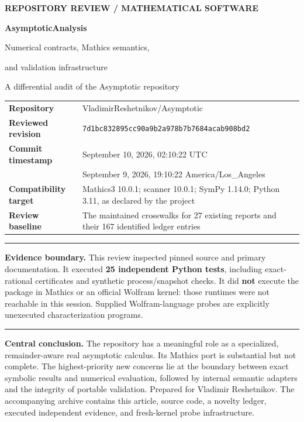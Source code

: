 \documentclass[11pt,letterpaper]{article}
\newcommand{\Snapshot}{7d1bc832895cc90a9b2a978b7b7684acab908bd2}
\begin{document}
\begin{titlepage}
\vspace*{0.45in}
{\small\bfseries\color{accent}REPOSITORY REVIEW \quad / \quad MATHEMATICAL SOFTWARE}\par
\vspace{0.35in}
{\Huge\bfseries\color{ink}AsymptoticAnalysis}\par
\vspace{0.15in}
{\LARGE Numerical contracts, Mathics semantics,\par and validation infrastructure}\par
\vspace{0.35in}
{\large A differential audit of the Asymptotic repository}\par
\vspace{0.3in}
\begin{tabularx}{\textwidth}{@{}lY@{}}
\textbf{Repository} & VladimirReshetnikov/Asymptotic\\[5pt]
\textbf{Reviewed revision} & \small\texttt{\Snapshot}\\[5pt]
\textbf{Commit timestamp} & September 10, 2026, 02:10:22 UTC\\
 & September 9, 2026, 19:10:22 America/Los\_Angeles\\[5pt]
\textbf{Compatibility target} & Mathics3 10.0.1; scanner 10.0.1; SymPy 1.14.0; Python 3.11, as declared by the project\\[5pt]
\textbf{Review baseline} & The maintained crosswalks for 27 existing reports and their 167 identified ledger entries\\
\end{tabularx}
\vspace{0.3in}
\hrule
\vspace{0.13in}
\textbf{Evidence boundary.} This review inspected pinned source and primary documentation. It executed \textbf{25 independent Python tests}, including exact-rational certificates and synthetic process/snapshot checks. It did \textbf{not} execute the package in Mathics or an official Wolfram kernel: those runtimes were not reachable in this session. Supplied Wolfram-language probes are explicitly unexecuted characterization programs.
\vspace{0.13in}
\hrule
\vfill
\textbf{Central conclusion.} The repository has a meaningful role as a specialized, remainder-aware real asymptotic calculus. Its Mathics port is substantial but not complete. The highest-priority new concerns lie at the boundary between exact symbolic results and numerical evaluation, followed by internal semantic adapters and the integrity of portable validation.
\vspace{0.25in}
{\small Prepared for Vladimir Reshetnikov. The accompanying archive contains this article, source code, a novelty ledger, executed independent evidence, and fresh-kernel probe infrastructure.}
\end{titlepage}
\end{document}
